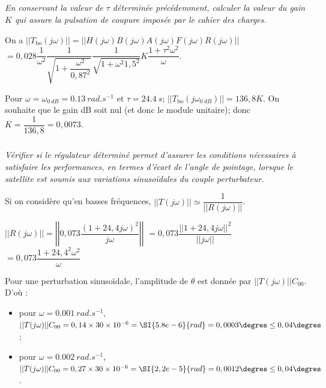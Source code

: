 \subparagraph{\label{q_22}}\textit{En conservant la valeur de $\tau$ déterminée précédemment, 
calculer la valeur du gain $K$ qui assure la pulsation de coupure imposée par le cahier des charges.}
\ifprof
\begin{corrige}
On a $||T_{\text{bo}}(j\omega)||=||H(j\omega)B(j\omega)A(j\omega)F(j\omega)R(j\omega)||$
$=0,028 \dfrac{1}{\omega^2}\dfrac{1}{\sqrt{1+\dfrac{\omega^2}{0,87^2}}}\dfrac{1}{\sqrt{1+\omega^2 1,5^2}} K \dfrac{1+\tau^2\omega^2}{\omega}$.

Pour $\omega = \omega_{\SI{0}{dB}}=\SI{0,13}{rad.s^{-1}}$ et $\tau=\SI{24,4}{s}$; 
$||T_{\text{bo}}(j\omega_{\SI{0}{dB}})|| = 136,8 K$. On souhaite que le gain dB soit nul (et donc le module unitaire); donc $K= \dfrac{1}{136,8} = 0,0073$.
\end{corrige}
\else
\fi

\subparagraph{\label{q_23}}\textit{Vérifier si le régulateur déterminé permet d’assurer les conditions nécessaires à satisfaire les performances,
en termes d’écart de l’angle de pointage, lorsque le satellite est soumis aux variations sinusoïdales du couple
perturbateur.}
\ifprof
\begin{corrige}

Si on considère qu'en basses fréquences,  $||T(j\omega)||\simeq \dfrac{1}{|| R\left(j\omega\right)||}$.


$|| R\left(j\omega\right)|| = \left|\left| 0,073  \dfrac{\left(1+24,4 j \omega\right)^2}{j\omega}\right|\right|$
$=0,073  \dfrac{ \left|\left| 1+24,4 j \omega \right|\right| ^2}{ \left|\left| j\omega\right|\right|}$
$=0,073  \dfrac{ 1+24,4^2  \omega^2 }{ \omega}$

Pour une perturbation sinusoïdale, l'amplitude de $\theta$ est donnée par $||T(j\omega)|| C_{00}$.  D'où :
\begin{itemize}
\item pour $\omega = \SI{0,001}{rad.s^{-1}}$, $||T(j\omega)|| C_{00} = 0,14 \times 30 \times 10^{-6} = \SI{5.8e-6}{rad} = 0,0003\degres\leq 0,04\degres$;
\item pour $\omega = \SI{0,002}{rad.s^{-1}}$, $||T(j\omega)|| C_{00} = 0,27 \times 30 \times 10^{-6} = \SI{2,2e-5}{rad} = 0,0012\degres\leq 0,04\degres$.
\end{itemize}
%  
\end{corrige}
\else
\fi


